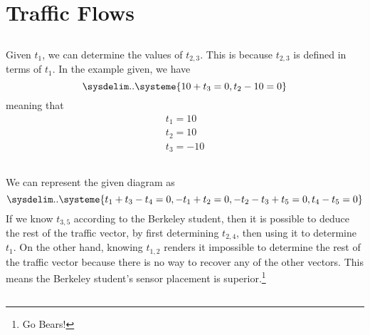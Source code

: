 \documentclass[]{article}
\numberwithin{equation}{section}
\begin{document}
\section{Traffic Flows}

\subsection{}

Given \(t_1\), we can determine the values of \(t_{2,3}\). This is because \(t_{2,3}\) is defined in terms of \(t_1\). In the example given, we have
\begin{equation}
	\sysdelim..\systeme{10 + t_3 = 0, t_2 - 10 = 0}
\end{equation}
meaning that 
\begin{equation}
	\begin{array}{c}
	t_1 = 10 \\
	t_2 = 10 \\
	t_3 = -10
	\end{array}
\end{equation}

\subsection{}

We can represent the given diagram as 
\begin{equation}\label{eq:4-b}
	\sysdelim..\systeme{t_1 + t_3 - t_4 = 0, -t_1 + t_2 = 0, -t_2 - t_3 + t_5 = 0, t_4 - t_5 = 0}
\end{equation}
If we know \(t_{3,5}\) according to the Berkeley student, then it is possible to deduce the rest of the traffic vector, by first determining \(t_{2,4}\), then using it to determine \(t_1\). On the other hand, knowing \(t_{1,2}\) renders it impossible to determine the rest of the traffic vector because there is no way to recover any of the other vectors. This means the Berkeley student's sensor placement is superior.\footnote{Go Bears!}

\subsection{}
\end{document}
